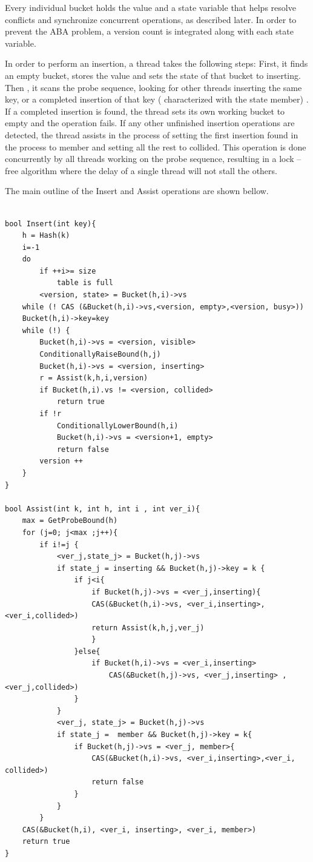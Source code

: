 Every individual bucket holds the value and a state variable that helps resolve conflicts and synchronize concurrent operations, as described later. In order to prevent the ABA  problem, a version count is integrated along with each state variable.

In order to perform an insertion, a thread takes the following steps: First, it finds an empty bucket, stores the value and sets the state of that bucket to inserting. Then , it scans the probe sequence, looking for other threads inserting the same key, or a completed insertion of that key  ( characterized with the state member) . If a completed insertion is found, the thread sets its own working bucket to empty and the operation fails. If any other unfinished insertion operations are detected, the thread assists in the process of setting the first insertion found in the process to member and setting all the rest to collided. This operation is done concurrently by all threads working on the probe sequence, resulting in a lock –free algorithm where the delay of a single thread will not stall the others.

The main outline of the Insert and Assist operations are shown bellow.

\begin{lstlisting}[caption={Insert and Assist operation of the non blocking open addressing algorithm}]

bool Insert(int key){
	h = Hash(k)
	i=-1
	do
		if ++i>= size 
			table is full
		<version, state> = Bucket(h,i)->vs
	while (! CAS (&Bucket(h,i)->vs,<version, empty>,<version, busy>))
	Bucket(h,i)->key=key
	while (!) {
		Bucket(h,i)->vs = <version, visible>
		ConditionallyRaiseBound(h,j)
		Bucket(h,i)->vs = <version, inserting>
		r = Assist(k,h,i,version)
		if Bucket(h,i).vs != <version, collided>
			return true
		if !r
			ConditionallyLowerBound(h,i)
			Bucket(h,i)->vs = <version+1, empty>
			return false
		version ++
	}
}

bool Assist(int k, int h, int i , int ver_i){
	max = GetProbeBound(h)
	for (j=0; j<max ;j++){
		if i!=j {
			<ver_j,state_j> = Bucket(h,j)->vs
			if state_j = inserting && Bucket(h,j)->key = k {
				if j<i{
					if Bucket(h,j)->vs = <ver_j,inserting){
					CAS(&Bucket(h,i)->vs, <ver_i,inserting>, <ver_i,collided>)
					return Assist(k,h,j,ver_j)
					}
				}else{
					if Bucket(h,i)->vs = <ver_i,inserting>
						CAS(&Bucket(h,j)->vs, <ver_j,inserting> ,<ver_j,collided>)
				}
			}
			<ver_j, state_j> = Bucket(h,j)->vs
			if state_j =  member && Bucket(h,j)->key = k{
				if Bucket(h,j)->vs = <ver_j, member>{
					CAS(&Bucket(h,i)->vs, <ver_i,inserting>,<ver_i, collided>)
					return false
				}
			}
		}
	CAS(&Bucket(h,i), <ver_i, inserting>, <ver_i, member>)
	return true
}

					
						
\end{lstlisting}

